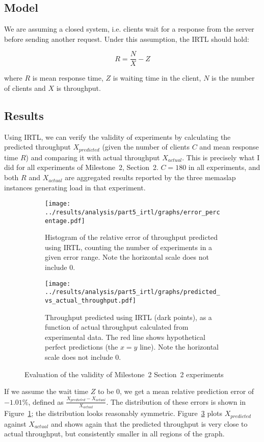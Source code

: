 \documentclass[11pt]{article}
\begin{document}
\subsection{Model}

We are assuming a closed system, i.e. clients wait for a response from the server before sending another request. Under this assumption, the IRTL should hold:

$$R = \frac{N}{X} - Z$$

where $R$ is mean response time, $Z$ is waiting time in the client, $N$ is the number of clients and $X$ is throughput.

\subsection{Results}

Using IRTL, we can verify the validity of experiments by calculating the predicted throughput $X_{predicted}$ (given the number of clients $C$ and mean response time $R$) and comparing it with actual throughput $X_{actual}$. This is precisely what I did for all experiments of Milestone~2, Section~2. $C=180$ in all experiments, and both $R$ and $X_{actual}$ are aggregated results reported by the three memaslap instances generating load in that experiment.

\begin{figure}[h]
\centering
\begin{subfigure}[t]{0.49\textwidth}
\texttt{[image: ../results/analysis/part5\_irtl/graphs/error\_percentage.pdf]}
\caption{Histogram of the relative error of throughput predicted using IRTL, counting the number of experiments in a given error range. Note the horizontal scale does not include 0.}
\label{fig:part5:error_percentage}
\end{subfigure}
\begin{subfigure}[t]{0.49\textwidth}
\texttt{[image: ../results/analysis/part5\_irtl/graphs/predicted\_vs\_actual\_throughput.pdf]}
\caption{Throughput predicted using IRTL (dark points), as a function of actual throughput calculated from experimental data. The red line shows hypothetical perfect predictions (the $x=y$ line). Note the horizontal scale does not include 0.}
\label{fig:part5:predicted_vs_actual}
\end{subfigure}
\caption{Evaluation of the validity of Milestone~2 Section~2 experiments}
\end{figure}

If we assume the wait time $Z$ to be 0, we get a mean relative prediction error of $-1.01\%$, defined as $\frac{X_{predicted}-X_{actual}}{X_{actual}}$. The distribution of these errors is shown in Figure~\ref{fig:part5:error_percentage}; the distribution looks reasonably symmetric. Figure~\ref{fig:part5:predicted_vs_actual} plots $X_{predicted}$ against $X_{actual}$ and shows again that the predicted throughput is very close to actual throughput, but consistently smaller in all regions of the graph.
\end{document}
